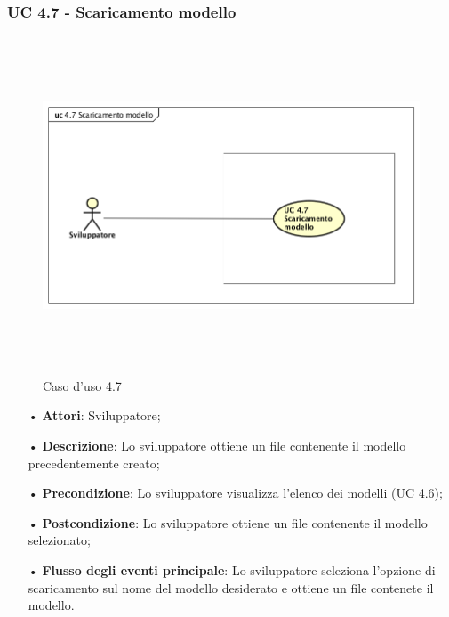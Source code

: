 \subsubsection{UC 4.7 - Scaricamento modello}
\begin{figure}[H]
\centering
\includegraphics[width=17cm, height=10cm]{img/UC470.png} 
\caption{Caso d'uso 4.7}\label{fig:470}
\end{figure}
\begin{itemize}
\item[•]\textbf{Attori}: Sviluppatore;
\item[•]\textbf{Descrizione}: Lo sviluppatore ottiene un file contenente il modello precedentemente creato;
\item[•]\textbf{Precondizione}: Lo sviluppatore visualizza l'elenco dei modelli (UC 4.6);
\item[•]\textbf{Postcondizione}: Lo sviluppatore ottiene un file contenente il modello selezionato;
\item[•]\textbf{Flusso degli eventi principale}:  Lo sviluppatore seleziona l'opzione di scaricamento sul nome del modello desiderato e ottiene un file contenete il modello.
\end{itemize}
